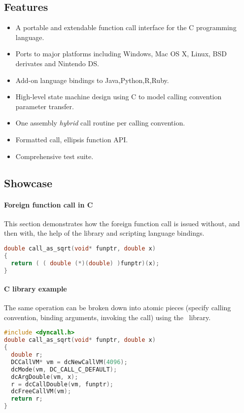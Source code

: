 \subsection{Features}

\begin{itemize}
\item A portable and extendable function call interface for the C programming 
language.
\item Ports to major platforms including Windows, Mac OS X, Linux, BSD derivates and Nintendo DS.
\item Add-on language bindings to Java,Python,R,Ruby.
\item High-level state machine design using C to model calling convention
parameter transfer.
\item One assembly \emph{hybrid} call routine per calling convention.
\item Formatted call, ellipsis function API.
\item Comprehensive test suite.
\end{itemize}

\pagebreak

\subsection{Showcase}

\paragraph{Foreign function call in C}
This section demonstrates how the foreign function call is issued without, and then 
with, the help of the  library and scripting language
bindings.

\begin{lstlisting}[language=c,caption=Foreign function call in C]
double call_as_sqrt(void* funptr, double x)
{
  return ( ( double (*)(double) )funptr)(x);
}
\end{lstlisting}

\paragraph{ C library example}

The same operation can be broken down into atomic pieces 
(specify calling convention, binding arguments, invoking the call)
using the \dc\ library.

\begin{lstlisting}[language=c,caption=Dyncall C library example]
#include <dyncall.h>
double call_as_sqrt(void* funptr, double x)
{
  double r;
  DCCallVM* vm = dcNewCallVM(4096);
  dcMode(vm, DC_CALL_C_DEFAULT);
  dcArgDouble(vm, x);  
  r = dcCallDouble(vm, funptr);
  dcFreeCallVM(vm);
  return r;
}
\end{lstlisting}

